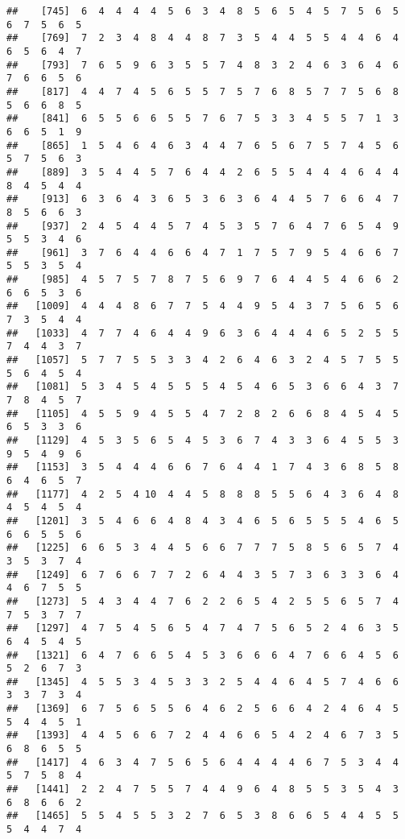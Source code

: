 \documentclass[
]{book}
\begin{document}
\begin{verbatim}
##    [745]  6  4  4  4  4  5  6  3  4  8  5  6  5  4  5  7  5  6  5  6  7  5  6  5
##    [769]  7  2  3  4  8  4  4  8  7  3  5  4  4  5  5  4  4  6  4  6  5  6  4  7
##    [793]  7  6  5  9  6  3  5  5  7  4  8  3  2  4  6  3  6  4  6  7  6  6  5  6
##    [817]  4  4  7  4  5  6  5  5  7  5  7  6  8  5  7  7  5  6  8  5  6  6  8  5
##    [841]  6  5  5  6  6  5  5  7  6  7  5  3  3  4  5  5  7  1  3  6  6  5  1  9
##    [865]  1  5  4  6  4  6  3  4  4  7  6  5  6  7  5  7  4  5  6  5  7  5  6  3
##    [889]  3  5  4  4  5  7  6  4  4  2  6  5  5  4  4  4  6  4  4  8  4  5  4  4
##    [913]  6  3  6  4  3  6  5  3  6  3  6  4  4  5  7  6  6  4  7  8  5  6  6  3
##    [937]  2  4  5  4  4  5  7  4  5  3  5  7  6  4  7  6  5  4  9  5  5  3  4  6
##    [961]  3  7  6  4  4  6  6  4  7  1  7  5  7  9  5  4  6  6  7  5  5  3  5  4
##    [985]  4  5  7  5  7  8  7  5  6  9  7  6  4  4  5  4  6  6  2  6  6  5  3  6
##   [1009]  4  4  4  8  6  7  7  5  4  4  9  5  4  3  7  5  6  5  6  7  3  5  4  4
##   [1033]  4  7  7  4  6  4  4  9  6  3  6  4  4  4  6  5  2  5  5  7  4  4  3  7
##   [1057]  5  7  7  5  5  3  3  4  2  6  4  6  3  2  4  5  7  5  5  5  6  4  5  4
##   [1081]  5  3  4  5  4  5  5  5  4  5  4  6  5  3  6  6  4  3  7  7  8  4  5  7
##   [1105]  4  5  5  9  4  5  5  4  7  2  8  2  6  6  8  4  5  4  5  6  5  3  3  6
##   [1129]  4  5  3  5  6  5  4  5  3  6  7  4  3  3  6  4  5  5  3  9  5  4  9  6
##   [1153]  3  5  4  4  4  6  6  7  6  4  4  1  7  4  3  6  8  5  8  6  4  6  5  7
##   [1177]  4  2  5  4 10  4  4  5  8  8  8  5  5  6  4  3  6  4  8  4  5  4  5  4
##   [1201]  3  5  4  6  6  4  8  4  3  4  6  5  6  5  5  5  4  6  5  6  6  5  5  6
##   [1225]  6  6  5  3  4  4  5  6  6  7  7  7  5  8  5  6  5  7  4  3  5  3  7  4
##   [1249]  6  7  6  6  7  7  2  6  4  4  3  5  7  3  6  3  3  6  4  4  6  7  5  5
##   [1273]  5  4  3  4  4  7  6  2  2  6  5  4  2  5  5  6  5  7  4  7  5  3  7  7
##   [1297]  4  7  5  4  5  6  5  4  7  4  7  5  6  5  2  4  6  3  5  6  4  5  4  5
##   [1321]  6  4  7  6  6  5  4  5  3  6  6  6  4  7  6  6  4  5  6  5  2  6  7  3
##   [1345]  4  5  5  3  4  5  3  3  2  5  4  4  6  4  5  7  4  6  6  3  3  7  3  4
##   [1369]  6  7  5  6  5  5  6  4  6  2  5  6  6  4  2  4  6  4  5  5  4  4  5  1
##   [1393]  4  4  5  6  6  7  2  4  4  6  6  5  4  2  4  6  7  3  5  6  8  6  5  5
##   [1417]  4  6  3  4  7  5  6  5  6  4  4  4  4  6  7  5  3  4  4  5  7  5  8  4
##   [1441]  2  2  4  7  5  5  7  4  4  9  6  4  8  5  5  3  5  4  3  6  8  6  6  2
##   [1465]  5  5  4  5  5  3  2  7  6  5  3  8  6  6  5  4  4  5  5  5  4  4  7  4

\end{verbatim}
\end{document}
